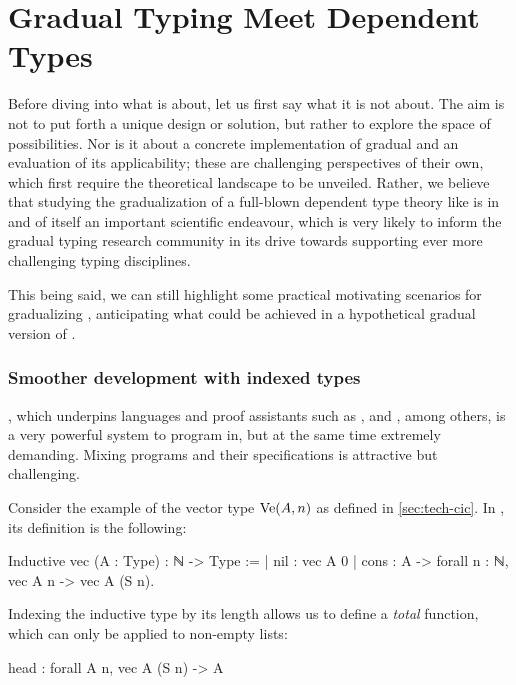 \chapter{Gradual Typing Meet Dependent Types}
\label{chap:gradual-dependent}

\margintoc

Before diving into what  is about, let us first say what it is not about.
The aim is not to put forth a unique design or solution,
but rather to explore the space of possibilities.
Nor is it about a concrete implementation of gradual  and an evaluation of its
applicability; these are challenging perspectives of their own,
which first require the theoretical landscape to be unveiled.
Rather, we believe that studying the gradualization of a full-blown dependent type theory
like  is in and of itself an important scientific endeavour,
which is very likely to inform the gradual typing research community in its drive towards
supporting ever more challenging typing disciplines.

This being said, we can still highlight some practical motivating scenarios
for gradualizing ,
anticipating what could be achieved in a hypothetical gradual version of \eg {}.

\subsection{Smoother development with indexed types}
  \label{sec:indices}
  
, which underpins languages and proof assistants such as ,
 and , among others, is a very powerful system to program in,
but at the same time extremely demanding.
Mixing programs and their specifications is attractive but challenging.

Consider the example of the vector type $\operatorname{Ve}(A,n)$ as defined in \cref{sec:tech-cic}.
In , its definition is the following:

\begin{coqcode}
Inductive vec (A : Type) : ℕ -> Type :=
| nil  : vec A 0
| cons : A -> forall n : ℕ, vec A n -> vec A (S n).
\end{coqcode}

Indexing the inductive type by its length allows us to define a \emph{total}
 function, which can only be applied to non-empty lists:
\begin{coqcode}
  head : forall A n, vec A (S n) -> A
\end{coqcode}
  

